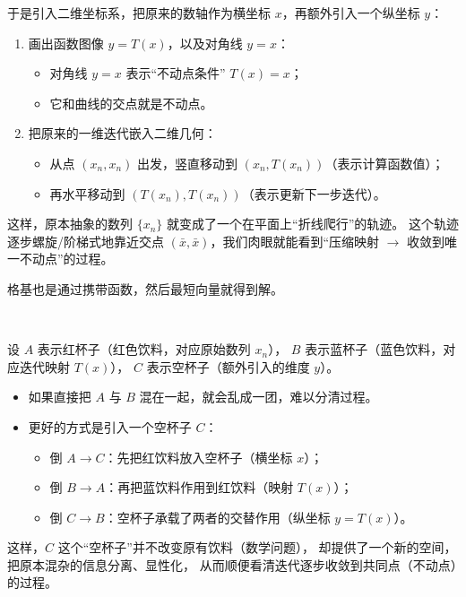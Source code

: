 于是引入二维坐标系，把原来的数轴作为横坐标 $x$，再额外引入一个纵坐标 $y$：
\begin{enumerate}
  \item 画出函数图像 $y = T(x)$，以及对角线 $y = x$：
  \begin{itemize}
    \item 对角线 $y = x$ 表示“不动点条件” $T(x) = x$；
    \item 它和曲线的交点就是不动点。
  \end{itemize}

  \item 把原来的一维迭代嵌入二维几何：
  \begin{itemize}
    \item 从点 $(x_n, x_n)$ 出发，竖直移动到 $(x_n, T(x_n))$（表示计算函数值）；
    \item 再水平移动到 $(T(x_n), T(x_n))$（表示更新下一步迭代）。
  \end{itemize}
\end{enumerate}

这样，原本抽象的数列 $\{x_n\}$ 就变成了一个在平面上“折线爬行”的轨迹。  
这个轨迹逐步螺旋/阶梯式地靠近交点 $(\bar{x}, \bar{x})$，我们肉眼就能看到“压缩映射 $\to$ 收敛到唯一不动点”的过程。
\begin{dxtips}
    格基也是通过携带函数，然后最短向量就得到解。
\end{dxtips}
\\
\begin{remark}
设 $A$ 表示红杯子（红色饮料，对应原始数列 $x_n$），
$B$ 表示蓝杯子（蓝色饮料，对应迭代映射 $T(x)$），
$C$ 表示空杯子（额外引入的维度 $y$）。

\begin{itemize}
  \item 如果直接把 $A$ 与 $B$ 混在一起，就会乱成一团，难以分清过程。
  \item 更好的方式是引入一个空杯子 $C$：
    \begin{itemize}
      \item 倒 $A \to C$：先把红饮料放入空杯子（横坐标 $x$）；
      \item 倒 $B \to A$：再把蓝饮料作用到红饮料（映射 $T(x)$）；
      \item 倒 $C \to B$：空杯子承载了两者的交替作用（纵坐标 $y = T(x)$）。
    \end{itemize}
\end{itemize}

这样，$C$ 这个“空杯子”并不改变原有饮料（数学问题），
却提供了一个新的空间，把原本混杂的信息分离、显性化，
从而顺便看清迭代逐步收敛到共同点（不动点）的过程。
\end{remark}

